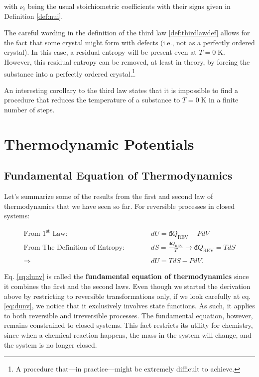 \documentclass[
]{book}
\theoremstyle{definition}
\theoremstyle{definition}
\theoremstyle{definition}
\theoremstyle{remark}
\begin{document}
with \(\nu_i\) being the usual stoichiometric coefficients with their signs given in Definition \ref{def:nui}.

The careful wording in the definition of the third law \ref{def:thirdlawdef} allows for the fact that some crystal might form with defects (i.e., not as a perfectly ordered crystal). In this case, a residual entropy will be present even at \(T=0 \; \text{K}\). However, this residual entropy can be removed, at least in theory, by forcing the substance into a perfectly ordered crystal.\footnote{A procedure that---in practice---might be extremely difficult to achieve.}

An interesting corollary to the third law states that it is impossible to find a procedure that reduces the temperature of a substance to \(T=0 \; \text{K}\) in a finite number of steps.

\hypertarget{Potentials}{%
\chapter{Thermodynamic Potentials}\label{Potentials}}

\hypertarget{fundeq}{%
\section{Fundamental Equation of Thermodynamics}\label{fundeq}}

Let's summarize some of the results from the first and second law of thermodynamics that we have seen so far. For reversible processes in closed systems:

\begin{equation}
\begin{aligned}
\text{From 1}^{\text{st}} \text{ Law:} \qquad \quad & dU = đQ_{\mathrm{REV}}-PdV \\
\text{From The Definition of Entropy:} \qquad \quad & dS = \frac{đQ_{\mathrm{REV}}}{T} \rightarrow đQ_{\mathrm{REV}} = TdS \\
\\
\Rightarrow \quad & dU = TdS - PdV.
\end{aligned}
\label{eq:dunv}
\end{equation}

Eq. \eqref{eq:dunv} is called the \textbf{fundamental equation of thermodynamics} since it combines the first and the second laws. Even though we started the derivation above by restricting to reversible transformations only, if we look carefully at eq. \eqref{eq:dunv}, we notice that it exclusively involves state functions. As such, it applies to both reversible and irreversible processes. The fundamental equation, however, remains constrained to closed systems. This fact restricts its utility for chemistry, since when a chemical reaction happens, the mass in the system will change, and the system is no longer closed.
\end{document}
